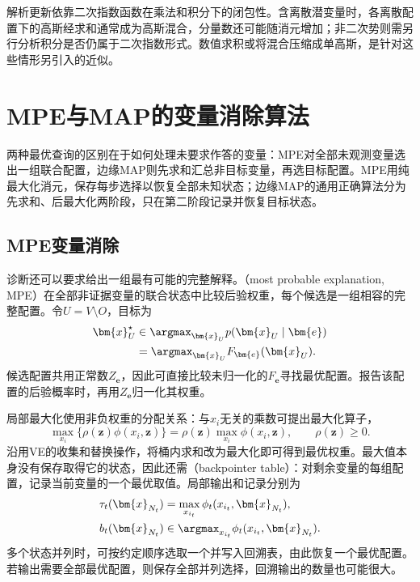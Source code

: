 解析更新依靠二次指数函数在乘法和积分下的闭包性。含离散潜变量时，各离散配置下的高斯经求和通常成为高斯混合，分量数还可能随消元增加；非二次势则需另行分析积分是否仍属于二次指数形式。数值求积或将混合压缩成单高斯，是针对这些情形另引入的近似。

\section{MPE与MAP的变量消除算法}
\label{sec:pgm-elimination-max-product}

两种最优查询的区别在于如何处理未要求作答的变量：MPE对全部未观测变量选出一组联合配置，边缘MAP则先求和汇总非目标变量，再选目标配置。MPE用纯最大化消元，保存每步选择以恢复全部未知状态；边缘MAP的通用正确算法分为先求和、后最大化两阶段，只在第二阶段记录并恢复目标状态。

\subsection{MPE变量消除}
\label{sec:pgm-elimination-mpe}

诊断还可以要求给出一组最有可能的完整解释。（most probable explanation, MPE）在全部非证据变量的联合状态中比较后验权重，每个候选是一组相容的完整配置。令$U=V\setminus O$，目标为
\begin{equation}
  \begin{aligned}
    \bm{x}_U^\star
    &\in\argmax_{\bm{x}_U}p(\bm{x}_U\mid\bm{e})\\
    &=\argmax_{\bm{x}_U}F_{\bm{e}}(\bm{x}_U).
  \end{aligned}
  \label{eq:pgm-elimination-mpe-objective}
\end{equation}
候选配置共用正常数$Z_{\bm{e}}$，因此可直接比较未归一化的$F_{\bm{e}}$寻找最优配置。报告该配置的后验概率时，再用$Z_{\bm{e}}$归一化其权重。

局部最大化使用非负权重的分配关系：与$x_i$无关的乘数可提出最大化算子，
\[
  \max_{x_i}\{\rho(\bm{z})\phi(x_i,\bm{z})\}
  =\rho(\bm{z})\max_{x_i}\phi(x_i,\bm{z}),
  \qquad \rho(\bm{z})\geq0.
\]
沿用VE的收集和替换操作，将桶内求和改为最大化即可得到最优权重。最大值本身没有保存取得它的状态，因此还需（backpointer table）：对剩余变量的每组配置，记录当前变量的一个最优取值。局部输出和记录分别为
\begin{equation}
  \begin{aligned}
    \tau_t(\bm{x}_{N_t})
      &=\max_{x_{i_t}}\phi_t(x_{i_t},\bm{x}_{N_t}),\\
    b_t(\bm{x}_{N_t})
      &\in\argmax_{x_{i_t}}\phi_t(x_{i_t},\bm{x}_{N_t}).
  \end{aligned}
  \label{eq:pgm-elimination-max-backpointer}
\end{equation}
多个状态并列时，可按约定顺序选取一个并写入回溯表，由此恢复一个最优配置。若输出需要全部最优配置，则保存全部并列选择，回溯输出的数量也可能很大。

